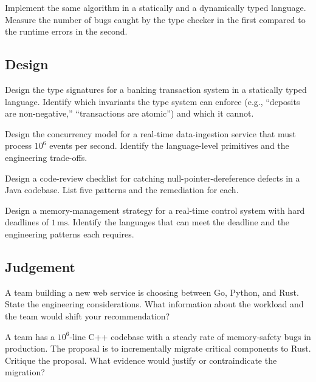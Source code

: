 \begin{exercise}
Implement the same algorithm in a statically and a dynamically typed language. Measure the number of bugs caught by the type checker in the first compared to the runtime errors in the second.
\end{exercise}

\subsection*{Design}

\begin{exercise}
Design the type signatures for a banking transaction system in a statically typed language. Identify which invariants the type system can enforce (e.g., ``deposits are non-negative,'' ``transactions are atomic'') and which it cannot.
\end{exercise}

\begin{exercise}
Design the concurrency model for a real-time data-ingestion service that must process $10^6$ events per second. Identify the language-level primitives and the engineering trade-offs.
\end{exercise}

\begin{exercise}
Design a code-review checklist for catching null-pointer-dereference defects in a Java codebase. List five patterns and the remediation for each.
\end{exercise}

\begin{exercise}
Design a memory-management strategy for a real-time control system with hard deadlines of $1\,\si{\milli\second}$. Identify the languages that can meet the deadline and the engineering patterns each requires.
\end{exercise}

\subsection*{Judgement}

\begin{exercise}
A team building a new web service is choosing between Go, Python, and Rust. State the engineering considerations. What information about the workload and the team would shift your recommendation?
\end{exercise}

\begin{exercise}
A team has a $10^6$-line C++ codebase with a steady rate of memory-safety bugs in production. The proposal is to incrementally migrate critical components to Rust. Critique the proposal. What evidence would justify or contraindicate the migration?
\end{exercise}

